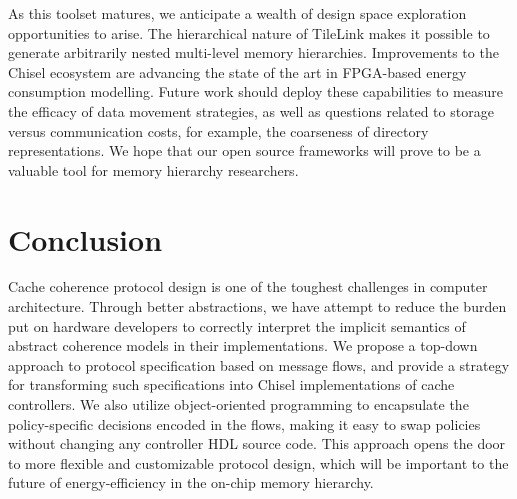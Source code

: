 As this toolset matures, we anticipate a wealth of design space exploration opportunities to arise.
The hierarchical nature of TileLink makes it possible to generate arbitrarily nested multi-level memory hierarchies.
Improvements to the Chisel ecosystem are advancing the state of the art in FPGA-based energy consumption modelling.
Future work should deploy these capabilities to measure the efficacy of data movement strategies,
as well as questions related to storage versus communication costs, for example, the coarseness of directory representations.
We hope that our open source frameworks will prove to be a valuable tool for memory hierarchy researchers.

\section{Conclusion}

Cache coherence protocol design is one of the toughest challenges in computer architecture.
Through better abstractions, we have attempt to reduce the burden put on hardware developers
to correctly interpret the implicit semantics of abstract coherence models in their implementations.
We propose a top-down approach to protocol specification based on message flows, and provide a strategy
for transforming such specifications into Chisel implementations of cache controllers.
We also utilize object-oriented programming to encapsulate the policy-specific decisions encoded
in the flows, making it easy to swap policies without changing any controller HDL source code.
This approach opens the door to more flexible and customizable protocol design, which will be important
to the future of energy-efficiency in the on-chip memory hierarchy.
